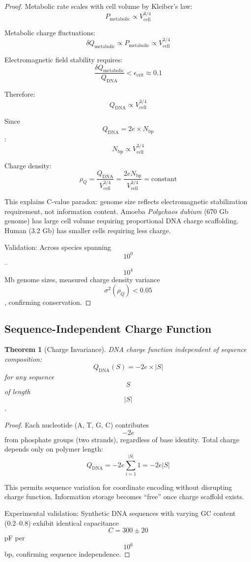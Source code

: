 \documentclass[11pt,twocolumn,a4paper]{article}
\newtheorem{theorem}{Theorem}[section]
\theoremstyle{remark}
\begin{document}
\begin{proof}
Metabolic rate scales with cell volume by Kleiber's law:
$$
P_{\mathrm{metabolic}} \propto V_{\mathrm{cell}}^{3/4}
$$

Metabolic charge fluctuations:
$$
\delta Q_{\mathrm{metabolic}} \propto P_{\mathrm{metabolic}} \propto V_{\mathrm{cell}}^{3/4}
$$

Electromagnetic field stability requires:
$$
\frac{\delta Q_{\mathrm{metabolic}}}{Q_{\mathrm{DNA}}} < \epsilon_{\mathrm{crit}} \approx 0.1
$$

Therefore:
$$
Q_{\mathrm{DNA}} \propto V_{\mathrm{cell}}^{3/4}
$$

Since $$Q_{\mathrm{DNA}} = 2e \times N_{\mathrm{bp}}$$:
$$
N_{\mathrm{bp}} \propto V_{\mathrm{cell}}^{3/4}
$$

Charge density:
$$
\rho_Q = \frac{Q_{\mathrm{DNA}}}{V_{\mathrm{cell}}^{3/4}} = \frac{2eN_{\mathrm{bp}}}{V_{\mathrm{cell}}^{3/4}} = \text{constant}
$$

This explains C-value paradox: genome size reflects electromagnetic stabilization requirement, not information content. Amoeba \textit{Polychaos dubium} (670 Gb genome) has large cell volume requiring proportional DNA charge scaffolding. Human (3.2 Gb) has smaller cells requiring less charge.

Validation: Across species spanning $$10^0$$--$$10^4$$ Mb genome sizes, measured charge density variance $$\sigma^2(\rho_Q) < 0.05$$, confirming conservation.
\end{proof}

\subsection{Sequence-Independent Charge Function}

\begin{theorem}[Charge Invariance]
\label{thm:charge_invariance}
DNA charge function independent of sequence composition:
$$
Q_{\mathrm{DNA}}(S) = -2e \times |S|
$$
for any sequence $$S$$ of length $$|S|$$.
\end{theorem}

\begin{proof}
Each nucleotide (A, T, G, C) contributes $$-2e$$ from phosphate groups (two strands), regardless of base identity. Total charge depends only on polymer length:
$$
Q_{\mathrm{DNA}} = -2e \sum_{i=1}^{|S|} 1 = -2e|S|
$$

This permits sequence variation for coordinate encoding without disrupting charge function. Information storage becomes ``free'' once charge scaffold exists.

Experimental validation: Synthetic DNA sequences with varying GC content (0.2--0.8) exhibit identical capacitance $$C = 300 \pm 20$$ pF per $$10^6$$ bp, confirming sequence independence.
\end{proof}
\end{document}
